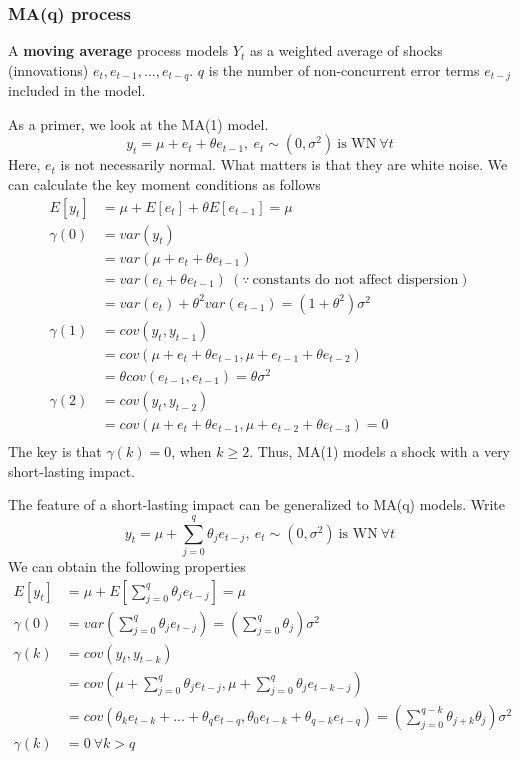 \documentclass[12pt]{article}
\theoremstyle{definition}
\theoremstyle{property}
\theoremstyle{assumption}
\theoremstyle{example}
\theoremstyle{comment}
\begin{document}
\subsubsection{MA(q) process}
A \textbf{moving average} process models $Y_t$ as a weighted average of shocks (innovations) $e_{t}, e_{t-1},...,e_{t-q}$. $q$ is the number of non-concurrent error terms $e_{t-j}$ included in the model.
\par
As a primer, we look at the MA(1) model.
\[
y_t = \mu+ e_t + \theta e_{t-1}, \ e_t \sim (0,\sigma^2) \ \text{is WN}\ \forall t 
\]
Here, $e_t$ is not necessarily normal. What matters is that they are white noise. We can calculate the key moment conditions as follows
\[
\begin{aligned}
E[y_t]&=\mu+E[e_t]+\theta E[e_{t-1}]=\mu\\
\gamma(0)&=var(y_t)\\
&=var(\mu+ e_t + \theta e_{t-1})\\
&=var(e_t + \theta e_{t-1}) \ (\because \ \text{constants do not affect dispersion})\\
&=var(e_t) + \theta^2 var(e_{t-1})=(1+\theta^2)\sigma^2\\
\gamma(1)&=cov(y_t,y_{t-1})\\
&=cov(\mu+ e_t + \theta e_{t-1},\mu+ e_{t-1} + \theta e_{t-2})\\
&=\theta cov(e_{t-1},e_{t-1})=\theta\sigma^2\\
\gamma(2)&=cov(y_t,y_{t-2})\\
&=cov(\mu+ e_t + \theta e_{t-1},\mu+ e_{t-2} + \theta e_{t-3})=0\\
\end{aligned}
\]
The key is that $\gamma(k)=0$, when $k\geq 2$. Thus, MA(1) models a shock with a very short-lasting impact. 
\par
The feature of a short-lasting impact can be generalized to MA(q) models. Write
\[
y_t = \mu+ \sum_{j=0}^q \theta_j e_{t-j}, \ e_t \sim (0,\sigma^2) \ \text{is WN}\ \forall t 
\]
We can obtain the following properties
\[
\begin{aligned}
E[y_t]&=\mu+E\left[\sum_{j=0}^q \theta_j e_{t-j}\right]=\mu\\
\gamma(0)&=var\left(\sum_{j=0}^q \theta_j e_{t-j}\right)=\left(\sum_{j=0}^q \theta_j\right)\sigma^2\\
\gamma(k)&=cov(y_t,y_{t-k})\\
&=cov\left(\mu+ \sum_{j=0}^q \theta_j e_{t-j},\mu+  \sum_{j=0}^q \theta_j e_{t-k-j}\right)\\
&=cov\left(\theta_ke_{t-k}+...+\theta_qe_{t-q}, \theta_0e_{t-k}+\theta_{q-k}e_{t-q}\right)=\left(\sum_{j=0}^{q-k}\theta_{j+k}\theta_j\right)\sigma^2\\
\gamma(k)&=0 \ \forall k>q
\end{aligned}
\]
\end{document}
